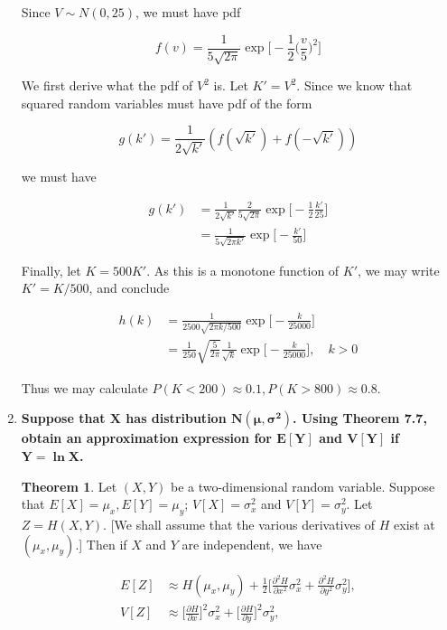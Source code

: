 \documentclass[10pt, oneside]{article}   	%
\theoremstyle{definition}
\newtheorem*{thm}{Theorem}
\begin{document}
\begin{enumerate}[label=9.\arabic*]
Since $V \sim N(0,25)$, we must have pdf

\[ f(v) = \frac{1}{5 \sqrt{2\pi }} \exp \bigg[ -\frac{1}{2} \bigg( \frac{v}{5} \bigg)^2 \bigg] \]

We first derive what the pdf of $V^2$ is. Let $K' = V^2$. Since we know that squared random variables must have pdf of the form

\[ g(k') = \frac{1}{2 \sqrt{k'}} (f(\sqrt{k'}) + f(-\sqrt{k'})) \]

we must have

\begin{align*}
g(k') &= \frac{1}{2 \sqrt{k'}} \frac{2}{5 \sqrt{2\pi}} \exp \bigg[ -\frac{1}{2} \frac{k'}{25} \bigg] \\
&= \frac{1}{5 \sqrt{2 \pi k'}} \exp \bigg[ -\frac{k'}{50} \bigg] 
\end{align*}

Finally, let $K = 500 K'$. As this is a monotone function of $K'$, we may write $K' = K/500$, and conclude

\begin{align*}
h(k) &= \frac{1}{2500 \sqrt{2\pi k / 500}} \exp \bigg[ -\frac{k}{25000} \bigg] \\
&= \boxed{ \frac{1}{250} \sqrt{\frac{5}{2\pi}} \frac{1}{\sqrt{k}} \exp \bigg[ -\frac{k}{25000} \bigg], \quad k > 0 }
\end{align*}

Thus we may calculate $\boxed{P(K < 200) \approx 0.1, P(K > 800) \approx 0.8}$.

\item  \begin{tcolorbox}[
  colback=Cerulean!5!white,
  colframe=Cerulean!75!black]
\textbf{Suppose that $\bm{X}$ has distribution $\bm{N(\mu, \sigma^2)}$. Using Theorem 7.7, obtain an approximation expression for $\bm{E[Y]}$ and $\bm{V[Y]}$ if $\bm{Y = \ln X}$.}
\end{tcolorbox}

\begin{thm}
Let $(X,Y)$ be a two-dimensional random variable. Suppose that $E[X] = \mu_x, E[Y] = \mu_y$; $V[X] = \sigma^2_x$ and $V[Y] = \sigma^2_y$. Let $Z = H(X,Y)$. [We shall assume that the various derivatives of $H$ exist at $(\mu_x, \mu_y)$.] Then if $X$ and $Y$ are independent, we have

\begin{align*}
E[Z] &\approx H(\mu_x, \mu_y) + \frac{1}{2} \bigg[ \frac{\partial^2 H}{\partial x^2} \sigma^2_x + \frac{\partial^2 H}{\partial y^2} \sigma^2_y \bigg], \\
V[Z] &\approx \bigg[ \frac{\partial H}{\partial x} \bigg]^2 \sigma^2_x + \bigg[ \frac{\partial H}{\partial y} \bigg]^2 \sigma^2_y,
\end{align*}


\end{thm}
\end{enumerate}
\end{document}
